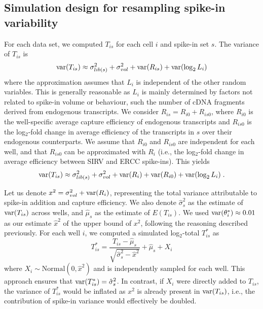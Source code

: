 \documentclass{article}
\begin{document}
\subsection{Simulation design for resampling spike-in variability}
For each data set, we computed $T_{is}$ for each cell $i$ and spike-in set $s$.
The variance of $T_{is}$ is
\[
    \mbox{var}(T_{is}) \approx \sigma^2_{lib(s)} + \sigma^2_{vol} + \mbox{var}(R_{is}) + \mbox{var}(\log_2 L_i)
\]
where the approximation assumes that $L_i$ is independent of the other random variables.
This is generally reasonable as $L_i$ is mainly determined by factors not related to spike-in volume or behaviour, such the number of cDNA fragments derived from endogenous transcripts.
We consider $R_{is} = R_{i0} + R_{is0}$, where $R_{i0}$ is the well-specific average capture efficiency of endogenous transcripts and $R_{is0}$ is the log$_2$-fold change in average efficiency of the transcripts in $s$ over their endogenous counterparts.
We assume that $R_{i0}$ and $R_{is0}$ are independent for each well, and that $R_{is0}$ can be approximated with $R_i$ (i.e., the log$_2$-fold change in average efficiency between SIRV and ERCC spike-ins).
This yields
\[
    \mbox{var}(T_{is}) \approx \sigma^2_{lib(s)} + \sigma^2_{vol} + \mbox{var}(R_i) + \mbox{var}(R_{i0}) + \mbox{var}(\log_2 L_i) \;.
\]


Let us denote $x^2 = \sigma^2_{vol} + \mbox{var}(R_i)$, representing the total variance attributable to spike-in addition and capture efficiency.
We also denote $\hat\sigma^2_s$ as the estimate of $\mbox{var}(T_{is})$ across wells, and $\hat\mu_s$ as the estimate of $E(T_{is})$.
We used $\mbox{var}(\theta^*_i) \approx 0.01$ as our estimate $\hat{x}^2$ of the upper bound of $x^2$, following the reasoning described previously.
For each well $i$, we computed a simulated log$_2$-total $T^*_{is}$ as
\[
    T^*_{is} = \frac{T_{is} - \hat\mu_s}{\sqrt{\hat\sigma^2_s - \hat{x}^2}} + \hat\mu_s + X_i
\]
where $X_i \sim \mbox{Normal}(0, \hat{x}^2)$ and is independently sampled for each well.
This approach ensures that $\mbox{var}(T^*_{is}) = \hat\sigma^2_s$.
In contrast, if $X_i$ were directly added to $T_{is}$, the variance of $T^*_{is}$ would be inflated as $x^2$ is already present in $\mbox{var}(T_{is})$, i.e., the contribution of spike-in variance would effectively be doubled.
\end{document}
